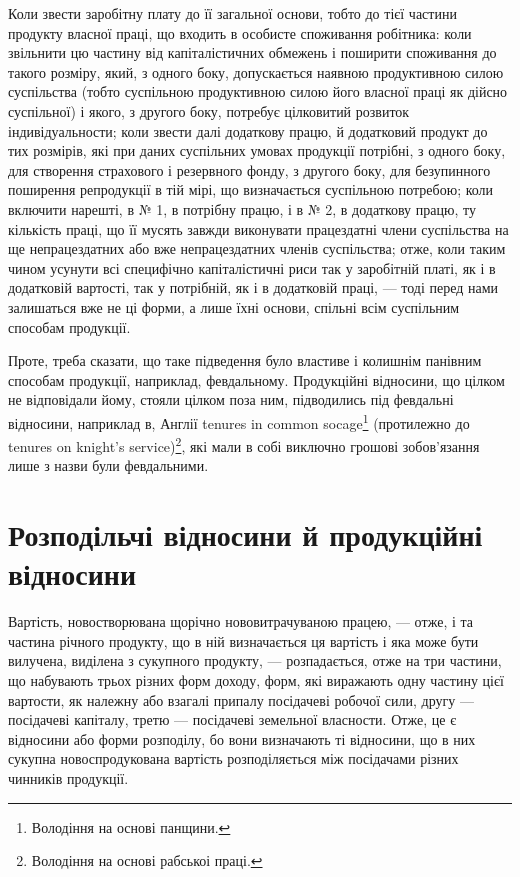 
Коли звести заробітну плату до її загальної основи, тобто до тієї частини
продукту власної праці, що входить в особисте споживання робітника: коли
звільнити цю частину від капіталістичних обмежень і поширити споживання до
такого розміру, який, з одного боку, допускається наявною продуктивною силою
суспільства (тобто суспільною продуктивною силою його власної праці як дійсно
суспільної) і якого, з другого боку, потребує цілковитий розвиток індивідуальности; коли звести далі
додаткову працю, й додатковий продукт до тих розмірів,
які при даних суспільних умовах продукції потрібні, з одного боку, для створення
страхового і резервного фонду, з другого боку, для безупинного поширення
репродукції в тій мірі, що визначається суспільною потребою; коли включити
нарешті, в № 1, в потрібну працю, і в № 2, в додаткову працю, ту кількість
праці, що її мусять завжди виконувати працездатні члени суспільства на ще
непрацездатних або вже непрацездатних членів суспільства; отже, коли таким
чином усунути всі специфічно капіталістичні риси так у заробітній платі, як і в
додатковій вартості, так у потрібній, як і в додатковій праці, — тоді перед
нами залишаться вже не ці форми, а лише їхні основи, спільні всім суспільним
способам продукції.

Проте, треба сказати, що таке підведення було властиве і колишнім панівним
способам продукції, наприклад, февдальному. Продукційні відносини, що
цілком не відповідали йому, стояли цілком поза ним, підводились під февдальні
відносини, наприклад в, Англії tenures in common socage\footnote*{
Володіння на основі панщини. 
} (протилежно до tenures
on knight’s service)\footnote*{
Володіння на основі рабськоі праці. 
}, які мали в собі виключно грошові зобов’язання
лише з назви були февдальними.

\section{Розподільчі відносини й продукційні відносини}
\vspace{\medskipamount} 

Вартість, новостворювана щорічно нововитрачуваною працею, — отже, і та
частина річного продукту, що в ній визначається ця вартість і яка може бути
вилучена, виділена з сукупного продукту, — розпадається, отже на три частини,
що набувають трьох різних форм доходу, форм, які виражають одну частину
цієї вартости, як належну або взагалі припалу посідачеві робочої
сили, другу — посідачеві капіталу, третю — посідачеві земельної власности.
Отже, це є відносини або форми розподілу, бо вони визначають ті відносини,
що в них сукупна новоспродукована вартість розподіляється між посідачами
різних чинників продукції.

